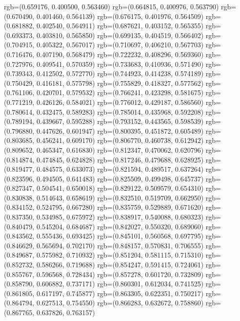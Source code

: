 {{{					rgb=(0.659176, 0.400500, 0.563460)
					rgb=(0.664815, 0.400976, 0.563790)
					rgb=(0.670490, 0.401460, 0.564139)
					rgb=(0.676175, 0.401976, 0.564509)
					rgb=(0.681882, 0.402540, 0.564911)
					rgb=(0.687621, 0.403152, 0.565355)
					rgb=(0.693373, 0.403810, 0.565850)
					rgb=(0.699135, 0.404519, 0.566402)
					rgb=(0.704915, 0.405322, 0.567017)
					rgb=(0.710697, 0.406210, 0.567703)
					rgb=(0.716476, 0.407190, 0.568479)
					rgb=(0.722232, 0.408296, 0.569360)
					rgb=(0.727976, 0.409541, 0.570359)
					rgb=(0.733683, 0.410936, 0.571490)
					rgb=(0.739343, 0.412502, 0.572770)
					rgb=(0.744923, 0.414238, 0.574189)
					rgb=(0.750429, 0.416181, 0.575798)
					rgb=(0.755829, 0.418327, 0.577562)
					rgb=(0.761106, 0.420701, 0.579532)
					rgb=(0.766241, 0.423298, 0.581675)
					rgb=(0.771219, 0.426126, 0.584021)
					rgb=(0.776012, 0.429187, 0.586560)
					rgb=(0.780614, 0.432475, 0.589283)
					rgb=(0.785014, 0.435968, 0.592208)
					rgb=(0.789194, 0.439667, 0.595288)
					rgb=(0.793152, 0.443565, 0.598539)
					rgb=(0.796880, 0.447626, 0.601947)
					rgb=(0.800395, 0.451872, 0.605489)
					rgb=(0.803685, 0.456241, 0.609170)
					rgb=(0.806770, 0.460738, 0.612942)
					rgb=(0.809652, 0.465347, 0.616830)
					rgb=(0.812347, 0.470062, 0.620796)
					rgb=(0.814874, 0.474845, 0.624828)
					rgb=(0.817246, 0.479688, 0.628925)
					rgb=(0.819477, 0.484575, 0.633073)
					rgb=(0.821594, 0.489517, 0.637264)
					rgb=(0.823596, 0.494505, 0.641483)
					rgb=(0.825509, 0.499498, 0.645737)
					rgb=(0.827347, 0.504541, 0.650018)
					rgb=(0.829122, 0.509579, 0.654310)
					rgb=(0.830838, 0.514643, 0.658619)
					rgb=(0.832510, 0.519709, 0.662950)
					rgb=(0.834152, 0.524795, 0.667280)
					rgb=(0.835759, 0.529889, 0.671620)
					rgb=(0.837350, 0.534985, 0.675972)
					rgb=(0.838917, 0.540088, 0.680323)
					rgb=(0.840479, 0.545204, 0.684687)
					rgb=(0.842027, 0.550320, 0.689060)
					rgb=(0.843562, 0.555436, 0.693425)
					rgb=(0.845101, 0.560568, 0.697795)
					rgb=(0.846629, 0.565694, 0.702170)
					rgb=(0.848157, 0.570831, 0.706555)
					rgb=(0.849687, 0.575982, 0.710932)
					rgb=(0.851204, 0.581115, 0.715310)
					rgb=(0.852732, 0.586266, 0.719688)
					rgb=(0.854247, 0.591415, 0.724061)
					rgb=(0.855767, 0.596568, 0.728434)
					rgb=(0.857278, 0.601720, 0.732809)
					rgb=(0.858790, 0.606882, 0.737171)
					rgb=(0.860301, 0.612034, 0.741525)
					rgb=(0.861805, 0.617197, 0.745877)
					rgb=(0.863305, 0.622351, 0.750217)
					rgb=(0.864794, 0.627513, 0.754550)
					rgb=(0.866283, 0.632672, 0.758860)
					rgb=(0.867765, 0.637826, 0.763157)
}}}
